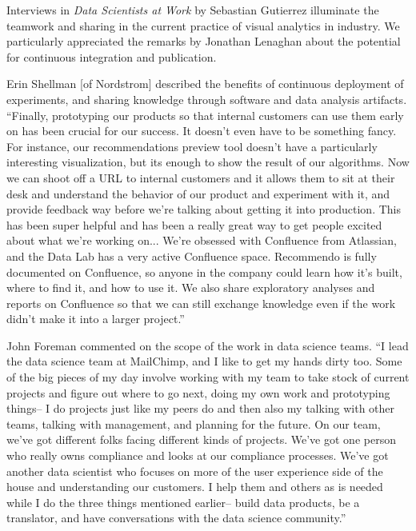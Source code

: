 Interviews in {\it Data Scientists at Work} by Sebastian Gutierrez illuminate
the teamwork and sharing in the current practice of visual analytics in industry.
We particularly appreciated the remarks by Jonathan Lenaghan about the potential
for continuous integration and publication.

Erin Shellman [of Nordstrom] described the benefits of
continuous deployment of experiments, and sharing knowledge
through software and data analysis artifacts.
``Finally, prototyping our products so that internal
customers can use them early on has been crucial for
our success. It doesn't even have to be something
fancy. For instance, our recommendations preview
tool doesn't have a particularly interesting
visualization, but its enough to show the result of our
algorithms. Now we can shoot off a URL to internal
customers and it allows them to sit at their desk and
understand the behavior of our product and
experiment with it, and provide feedback way before
we're talking about getting it into production. This
has been super helpful and has been a really great
way to get people excited about what we're working
on...
%
We’re obsessed with Confluence from
Atlassian, and the Data Lab has a very active
Confluence space. Recommendo is fully documented
on Confluence, so anyone in the company could learn
how it’s built, where to find it, and how to use it.
We also share exploratory analyses and reports on
Confluence so that we can still exchange knowledge
even if the work didn't make it into a larger project.''

John Foreman commented on the scope of the work in
data science teams.
``I lead the data science team at
MailChimp, and I like to get my hands dirty too.
Some of the big pieces of my day involve working
with my team to take stock of current projects and
figure out where to go next, doing my own work and
prototyping things-- I do projects just like my peers
do and then also my talking with other teams,
talking with management, and planning for the
future.
On our team, we've got different folks facing different
kinds of projects. We've got one person who really
owns compliance and looks at our compliance
processes. We've got another data scientist who
focuses on more of the user experience side of the
house and understanding our customers. I help them
and others as is needed while I do the three things
mentioned earlier-- build data products, be a
translator, and have conversations with the data
science community.''

